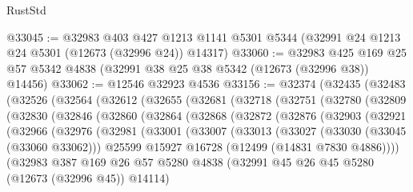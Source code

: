 \begin{lexlean}{RustStd}
\begin{coremodule}
{\begin{coremodule}
{{{{{{{{{{{{{{{{{{{{{{{{{{{{{{{{{{{{{{{{{{{{{{{{{{{{{{{{{{{{{{{{{{{{{{{{{{{{{{{{@33045 := @32983
    @403
    @427
    @1213
    @1141
    @5301
    @5344
    (@32991 @24 @1213 @24 @5301 (@12673 (@32996 @24)) @14317)
@33060 := @32983
    @425
    @169
    @25
    @57
    @5342
    @4838
    (@32991 @38 @25 @38 @5342 (@12673 (@32996 @38)) @14456)
@33062 := @12546 @32923 @4536
@33156 := @32374
    (@32435
      (@32483
        (@32526
          (@32564
            (@32612
              (@32655
                (@32681
                  (@32718
                    (@32751
                      (@32780
                        (@32809
                          (@32830
                            (@32846
                              (@32860
                                (@32864
                                  (@32868
                                    (@32872
                                      (@32876
                                        (@32903
                                          (@32921
                                            (@32966
                                              (@32976
                                                (@32981
                                                  (@33001
                                                    (@33007
                                                      (@33013
                                                        (@33027
                                                          (@33030 (@33045 (@33060 @33062)))
                                                          @25599
                                                          @15927
                                                          @16728
                                                          (@12499 (@14831 @7830 @4886))))
                                                      (@32983
                                                        @387
                                                        @169
                                                        @26
                                                        @57
                                                        @5280
                                                        @4838
                                                        (@32991
                                                          @45
                                                          @26
                                                          @45
                                                          @5280
                                                          (@12673 (@32996 @45))
                                                          @14114)
}}}}}}}}}}}}}}}}}}}}}}}}}}}}}}}}}}}}}}}}}}}}}}}}}}}}}}}}}}}}}}}}}}}}}}}}}}}}}}}}
\end{coremodule}}
\end{coremodule}
\end{lexlean}
